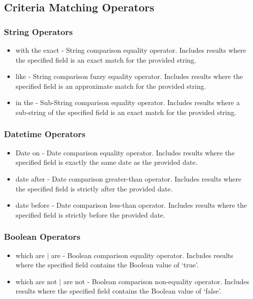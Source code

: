 \subsection{Criteria Matching Operators}
\subsubsection{String Operators}
\begin{itemize}
\item with the exact - String comparison equality operator. Includes results where the specified field is an exact match for the provided string.
\item like - String comparison fuzzy equality operator. Includes results where the specified field is an approximate match for the provided string.
\item in the - Sub-String comparison equality operator. Includes results where a sub-string of the specified field is an exact match for the provided string.
\end{itemize}
\subsubsection{Datetime Operators}
\begin{itemize}
\item Date on - Date comparison equality operator. Includes results where the specified field is exactly the same date as the provided date.
\item date after - Date comparison greater-than operator. Includes results where the specified field is strictly after the provided date.
\item date before - Date comparison less-than operator. Includes results where the specified field is strictly before the provided date.
\end{itemize}
\subsubsection{Boolean Operators}
\begin{itemize}
\item which are $|$ are - Boolean comparison equality operator. Includes results where the specified field contains the Boolean value of `true'.
\item which are not $|$ are not - Boolean comparison non-equality operator. Includes results where the specified field contains the Boolean value of `false'.
\end{itemize}
